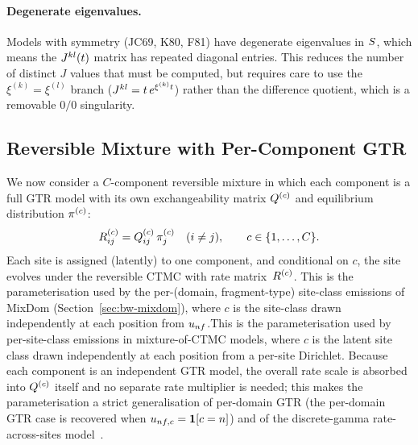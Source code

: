 \paragraph{Degenerate eigenvalues.}
Models with symmetry (JC69, K80, F81) have degenerate eigenvalues
in $S$, which means the $J^{kl}(t)$ matrix has
repeated diagonal entries.
This reduces the number of distinct $J$ values that must be computed,
but requires care to use the $\xi^{(k)} = \xi^{(l)}$ branch
($J^{kl} = t\, e^{\xi^{(k)}t}$)
rather than the difference quotient,
which is a removable $0/0$ singularity.


\subsection{Reversible Mixture with Per-Component GTR}
\label{sec:mstep-mixture}

We now consider a $C$-component reversible mixture in which each
component is a full GTR model with its own exchangeability matrix
$Q^{(c)}$ and equilibrium distribution $\pi^{(c)}$:
\begin{equation}\label{eq:mixture-Q}
R^{(c)}_{ij} = Q^{(c)}_{ij}\,\pi^{(c)}_j
\quad (i \neq j),
\qquad c \in \{1,\dots,C\}.
\end{equation}
Each site is assigned (latently) to one component, and conditional
on $c$, the site evolves under the reversible CTMC with rate
matrix~$R^{(c)}$.
\ifdefined\MIXDOMPAPER This is the parameterisation used by the per-(domain, fragment-type)
site-class emissions of MixDom (Section~\ref{sec:bw-mixdom}), where
$c$ is the site-class drawn independently at each position from
$u_{nf}$.\else This is the parameterisation used by per-site-class emissions in
mixture-of-CTMC models, where $c$ is the latent site class drawn
independently at each position from a per-site Dirichlet.\fi
Because each component is an independent GTR model, the overall
rate scale is absorbed into $Q^{(c)}$ itself and no separate
rate multiplier is needed; this makes the parameterisation a
strict generalisation of per-domain GTR (the per-domain GTR case
is recovered when $u_{nf,c} = \mathbf{1}[c = n]$)
and of the
discrete-gamma rate-across-sites model~\cite{Yang1994a}.

